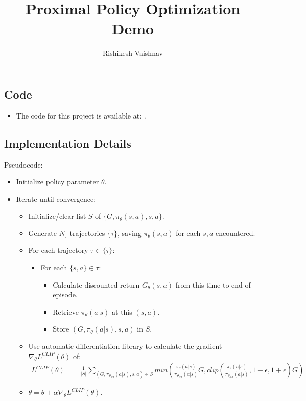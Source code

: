 \documentclass[a4paper]{article}
\title{Proximal Policy Optimization Demo}
\author{Rishikesh Vaishnav}
\begin{document}
\maketitle
\subsection*{Code}
\begin{itemize}
    \item The code for this project is available at: 
    \url{}.
\end{itemize}
\subsection*{Implementation Details}
Pseudocode:
\begin{itemize}
    \item Initialize policy parameter $\theta$.
    \item Iterate until convergence:
    \begin{itemize}
        \item Initialize/clear list $S$ of $\{G, \pi_{\theta}(s, a), s, a\}$.
        \item Generate $N_{\tau}$ trajectories $\{\tau\}$, saving 
            $\pi_{\theta}(s, a)$ for each $s, a$ encountered.
        \item For each trajectory $\tau \in \{\tau\}$:
        \begin{itemize}
            \item For each $\{s, a\} \in \tau$:
            \begin{itemize}
                \item Calculate discounted return $G_{\theta}(s, a)$ from this
                    time to end of episode.
                \item Retrieve $\pi_{\theta}(a | s)$ at this $(s, a)$.
                \item Store $(G, \pi_{\theta}(a | s), s, a)$ in $S$.
            \end{itemize}
        \end{itemize}
        \item Use automatic differentiation library to calculate the gradient
            $\nabla_{\theta}L^{CLIP}(\theta)$ of:
        \begin{align*}
            L^{CLIP}(\theta) &= \frac{1}{|S|}\sum_{(G, \pi_{\theta_{old}}(a |
            s), s, a) \in S} min\left(\frac{\pi_{\theta}(a |
            s)}{\pi_{\theta_{old}}(a | s)}G, clip\left(\frac{\pi_{\theta}(a |
            s)}{\pi_{\theta_{old}}(a | s)}, 1 - \epsilon, 1 +
            \epsilon\right)G\right)
        \end{align*}
        \item $\theta = \theta + \alpha\nabla_{\theta}L^{CLIP}(\theta)$.
    \end{itemize}
\end{itemize}
\end{document}
